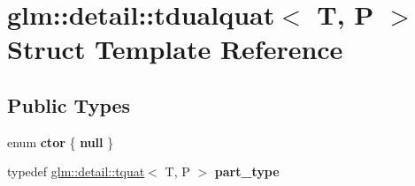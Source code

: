 \hypertarget{structglm_1_1detail_1_1tdualquat}{\section{glm\-:\-:detail\-:\-:tdualquat$<$ T, P $>$ Struct Template Reference}
\label{structglm_1_1detail_1_1tdualquat}
}
\subsection*{Public Types}
\begin{DoxyCompactItemize}
\item 
enum {\bfseries ctor} \{ {\bfseries null}
 \}
\item 
\hypertarget{structglm_1_1detail_1_1tdualquat_a811e451c41fec5277ac7c99381152df4}{typedef \hyperlink{structglm_1_1detail_1_1tquat}{glm\-::detail\-::tquat}$<$ T, P $>$ {\bfseries part\-\_\-type}}\label{structglm_1_1detail_1_1tdualquat_a811e451c41fec5277ac7c99381152df4}

\end{DoxyCompactItemize}
